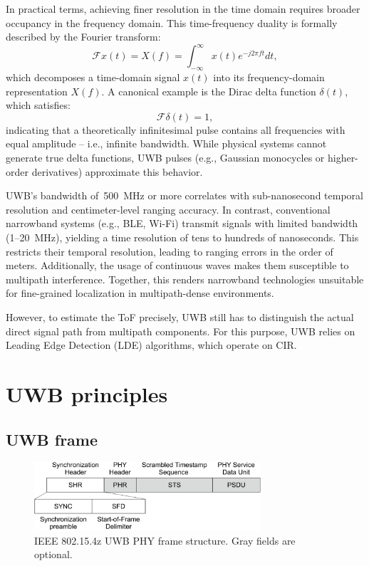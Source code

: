 In practical terms, achieving finer resolution in the time domain requires broader occupancy in the frequency domain. This time-frequency duality is formally described by the Fourier transform:
\begin{equation} 
\mathcal{F}{x(t)} = X(f) = \int_{-\infty}^{\infty} x(t) e^{-j2\pi ft} dt, 
\end{equation}
which decomposes a time-domain signal $x(t)$ into its frequency-domain representation $X(f)$. A canonical example is the Dirac delta function $\delta(t)$, which satisfies:
\begin{equation} \mathcal{F}{\delta(t)} = 1, \end{equation}
indicating that a theoretically infinitesimal pulse contains all frequencies with equal amplitude -- i.e., infinite bandwidth. While physical systems cannot generate true delta functions, UWB pulses (e.g., Gaussian monocycles or higher-order derivatives) approximate this behavior.

UWB's bandwidth of~\SI{500}{\mega\hertz} or more correlates with sub-nanosecond temporal resolution and centimeter-level ranging accuracy. In contrast, conventional narrowband systems (e.g., BLE, Wi-Fi) transmit signals with limited bandwidth (1–20~\si{\mega\hertz}), yielding a time resolution of tens to hundreds of nanoseconds. This restricts their temporal resolution, leading to ranging errors in the order of meters. Additionally, the usage of continuous waves makes them susceptible to multipath interference. Together, this renders narrowband technologies unsuitable for fine-grained localization in multipath-dense environments.

However, to estimate the ToF precisely, UWB still has to distinguish the actual direct signal path from multipath components. For this purpose, UWB relies on Leading Edge Detection (LDE) algorithms, which operate on CIR.

\section{UWB principles}\label{principles}
\subsection{UWB frame}

\begin{figure}[tbh]
\includegraphics[width=0.75\textwidth]{Figures/theoretical_background/uwb_phy.pdf}
\centering
\caption{IEEE 802.15.4z UWB PHY frame structure. Gray fields are optional.}
\label{fig:phy}
\end{figure}

